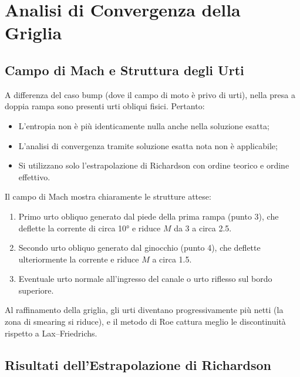 \section{Analisi di Convergenza della Griglia}
\label{sec:presa_convergenza}

\subsection{Campo di Mach e Struttura degli Urti}

A differenza del caso bump (dove il campo di moto è privo di urti), nella presa a doppia
rampa sono presenti urti obliqui fisici. Pertanto:
\begin{itemize}
  \item L'entropia non è più identicamente nulla anche nella soluzione esatta;
  \item L'analisi di convergenza tramite soluzione esatta nota non è applicabile;
  \item Si utilizzano solo l'estrapolazione di Richardson con ordine teorico e ordine effettivo.
\end{itemize}

Il campo di Mach mostra chiaramente le strutture attese:
\begin{enumerate}
  \item Primo urto obliquo generato dal piede della prima rampa (punto 3), che deflette la
    corrente di circa 10° e riduce $M$ da 3 a circa 2.5.
  \item Secondo urto obliquo generato dal ginocchio (punto 4), che deflette ulteriormente la
    corrente e riduce $M$ a circa 1.5.
  \item Eventuale urto normale all'ingresso del canale o urto riflesso sul bordo superiore.
\end{enumerate}

Al raffinamento della griglia, gli urti diventano progressivamente più netti
(la zona di smearing si riduce), e il metodo di Roe cattura meglio le discontinuità
rispetto a Lax--Friedrichs.

\subsection{Risultati dell'Estrapolazione di Richardson}

